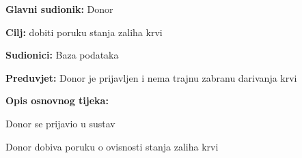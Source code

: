 \documentclass[11pt]{book}
\begin{document}
\noindent {}
					\begin{packed_item}
	
						\item \textbf{Glavni sudionik: }Donor
						\item \textbf{Cilj:} dobiti poruku stanja zaliha krvi
						\item \textbf{Sudionici:} Baza podataka
						\item \textbf{Preduvjet:} Donor je prijavljen i nema trajnu zabranu darivanja krvi
						\item \textbf{Opis osnovnog tijeka:}
						
						\item[] \begin{packed_enum}
	
							\item Donor se prijavio u sustav
							\item Donor dobiva poruku o ovisnosti stanja zaliha krvi
							
						\end{packed_enum}

					\end{packed_item}
\end{document}
